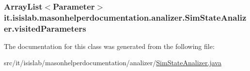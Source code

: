 \hypertarget{classit_1_1isislab_1_1masonhelperdocumentation_1_1analizer_1_1_sim_state_analizer_a5d09f5b05d69fbf599a274dce43934b2}{
\subsubsection[{visited\-Parameters}]{\setlength{\rightskip}{0pt plus 5cm}Array\-List$<${\bf Parameter}$>$ it.\-isislab.\-masonhelperdocumentation.\-analizer.\-Sim\-State\-Analizer.\-visited\-Parameters\hspace{0.3cm}{\ttfamily [private]}}}\label{classit_1_1isislab_1_1masonhelperdocumentation_1_1analizer_1_1_sim_state_analizer_a5d09f5b05d69fbf599a274dce43934b2}


The documentation for this class was generated from the following file\-:\begin{DoxyCompactItemize}
\item 
src/it/isislab/masonhelperdocumentation/analizer/\hyperlink{_sim_state_analizer_8java}{Sim\-State\-Analizer.\-java}\end{DoxyCompactItemize}
